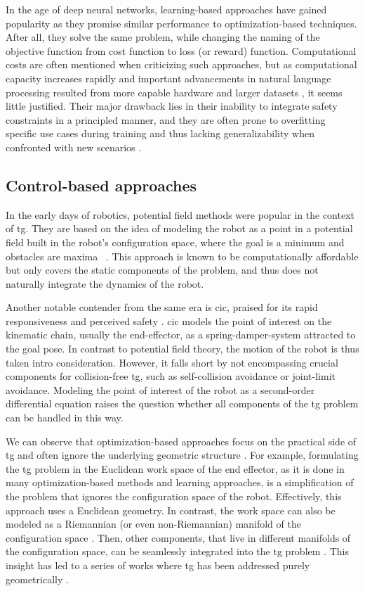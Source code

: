 In the age of deep neural networks, learning-based
approaches have gained popularity as they promise similar
performance to optimization-based techniques. After all,
they solve the same problem, while changing the naming of
the objective function from cost function to loss (or
reward) function. Computational costs are often mentioned when
criticizing such approaches, but as computational capacity
increases rapidly and important advancements in natural
language processing resulted from more capable hardware and
larger datasets \cite{radford2023robust}, it seems little
justified. Their major drawback lies in their
inability to integrate safety constraints in a principled
manner, and they are often prone to overfitting specific use cases during
training and thus lacking generalizability when confronted
with new scenarios \cite{noroozi2023conventional}.

\subsection*{Control-based approaches}
In the early days of robotics, potential field methods were
popular in the context of \ac{tg}.
They are based on the idea of modeling the robot as
a point in a potential field built in the robot's configuration
space, where the goal is a minimum
and obstacles are maxima
~\cite{barraquand1992numerical,hwang1992potential}. This
approach is known to be computationally affordable but
only covers the static components of the problem, and thus
does not naturally integrate the dynamics of the robot.

Another notable contender from the same era is \ac{cic},
praised for its rapid responsiveness and
perceived safety \cite{hogan1985impedance}. \ac{cic}
models the point of interest on the
kinematic chain, usually the end-effector, as a
spring-damper-system attracted to the goal pose. In contrast
to potential field theory, the motion of the robot is thus
taken intro consideration. However, it falls short by not
encompassing crucial components for collision-free
\ac{tg}, such as self-collision avoidance or joint-limit
avoidance.
Modeling the point of interest of the robot as a
second-order differential equation raises the question whether all
components of the \ac{tg} problem can be handled in this
way. 

We can observe that optimization-based approaches focus on
the practical side of \ac{tg} and often ignore the
underlying geometric structure \cite{Ratliff2015}. For
example, formulating the \ac{tg} problem in the Euclidean
work space of the end effector, as it is done in many
optimization-based methods and learning approaches, is a
simplification of the problem that ignores the configuration
space of the robot. Effectively, this approach uses a
Euclidean geometry. In contrast, the work space can also be
modeled as a Riemannian (or even non-Riemannian) manifold of
the configuration space \cite{klein2023design}. Then, other
components, that live in different manifolds of the
configuration space, can be seamlessly integrated into the
\ac{tg} problem \cite{Ratliff2015}. This insight has led to
a series of works where \ac{tg} has been addressed
purely geometrically
\cite{Ratliff2015,Ratliff2018,Cheng2020,Cheng2020a,Ratliff2020,Xie2020}.

